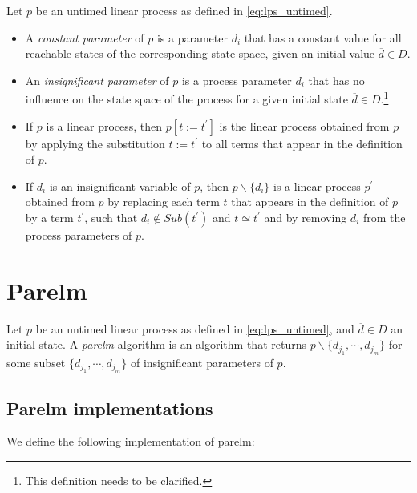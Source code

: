 \documentclass{article}
\begin{document}
Let $p$ be an untimed linear process as defined in \ref{eq:lps_untimed}.

\begin{itemize}
\item A \emph{constant parameter} of $p$ is a parameter $d_{i}$ that has a
constant value for all reachable states of the corresponding state space,
given an initial value $\overline{d}\in D$.

\item An \emph{insignificant parameter} of $p$ is a process parameter $d_{i}$
that has no influence on the state space of the process for a given initial
state $\overline{d}\in D$.\footnote{%
This definition needs to be clarified.}

\item If $p$ is a linear process, then $p[t:=t^{\prime }]$ is the linear
process obtained from $p$ by applying the substitution $t:=t^{\prime }$ to
all terms that appear in the definition of $p$.

\item If $d_{i}$ is an insignificant variable of $p$, then $p\backslash
\{d_{i}\}$ is a linear process $p^{\prime }$ obtained from $p$ by replacing
each term $t$ that appears in the definition of $p$ by a term $t^{\prime }$,
such that $d_{i}\notin Sub(t^{\prime })$ and $t\simeq t^{\prime }$ and by
removing $d_{i}$ from the process parameters of $p$.
\end{itemize}

\section{\protect\bigskip Parelm}

Let $p$ be an untimed linear process as defined in \ref{eq:lps_untimed}, and
$\overline{d}\in D$ an initial state. A \emph{parelm} algorithm is an
algorithm that returns $p\backslash \{d_{j_{1}},\cdots ,d_{j_{m}}\}$ for
some subset $\{d_{j_{1}},\cdots ,d_{j_{m}}\}$ of insignificant parameters of
$p$.

\subsection{\protect\bigskip Parelm implementations}

We define the following implementation of parelm:
\end{document}
